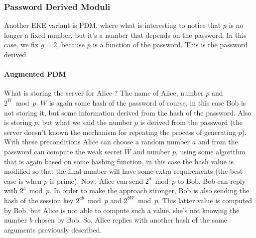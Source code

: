 \documentclass[11pt]{article}
\begin{document}
\subsubsection{Password Derived Moduli}
Another EKE variant is PDM, where what is interesting to notice that $p$ is no longer a fixed number, but it's a number that depends on the password. In this case, we fix $g = 2$, because $p$ is a function of the password. This is the password derived.
\paragraph{Augmented PDM} What is storing the server for Alice ? The name of Alice, number $p$ and $2^W \bmod p$. $W$ is again some hash of the password of course, in this case Bob is not storing it, but some information derived from the hash of the password. Also is storing $p$, but what we said the number $p$ is derived from the password (the server doesn't known the mechanism for repeating the process of generating $p$). With these preconditions Alice can choose a random number $a$ and from the password can compute the weak secret $W$ and number $p$, using some algorithm that is again based on some hashing function, in this case the hash value is modified so that the final number will have some extra requirements (the best case is when $p$ is prime). Now, Alice can send $2^a \bmod p$ to Bob. Bob can reply with $2^b \bmod p$. In order to make the approach stronger, Bob is also sending the hash of the session key $2^{ab} \bmod p$ and $2^{bW} \bmod p$. This latter value is computed by Bob, but Alice is not able to compute such a value, she's not knowing the number $b$ chosen by Bob. So, Alice replies with another hash of the same arguments previously described.
\end{document}

